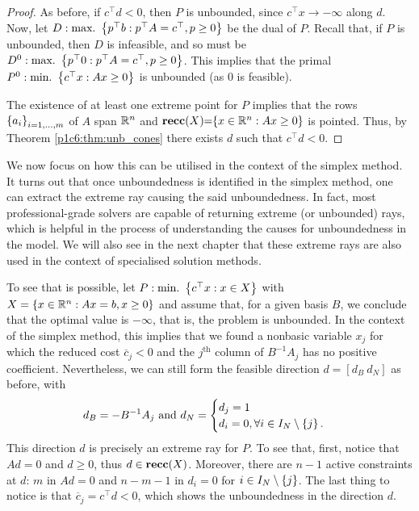 \begin{proof}
	As before, if $c^\top d < 0$, then $P$ is unbounded, since $c^\top x \rightarrow -\infty$ along $d$. Now, let 
	$D : \mathop{\text{max.~}} \left\{ p^\top b : p^\top A = c^\top, p \ge 0 \right \}$ be the dual of $P$. Recall that, if $P$ is unbounded, then $D$ is infeasible, and so must be $D^0 : \mathop{\text{max.~}} \left\{ p^\top 0 : p^\top A = c^\top, p \ge 0 \right \}$. This implies that the primal $P^0 : \mathop{\text{min.~}} \left\{ c^\top x : Ax \geq 0 \right \}$ is unbounded (as 0 is feasible).
			
	The existence of at least one extreme point for $P$ implies that the rows $\left\{ a_i \right \}_{i=1,\dots,m}$ of $A$ span $\mathbb{R}^n$ and  ${\bf recc}(X) \hspace{-3pt} =  \hspace{-3pt}\left\{ x \in \mathbb{R}^n : Ax \geq 0 \right \}$ is pointed. Thus, by Theorem \ref{p1c6:thm:unb_cones} there exists $d$ such that $c^\top d < 0$. \qedhere
\end{proof}

We now focus on how this can be utilised in the context of the simplex method. It turns out that once unboundedness is identified in the simplex method, one can extract the extreme ray causing the said unboundedness. In fact, most professional-grade solvers are capable of returning extreme (or unbounded) rays, which is helpful in the process of understanding the causes for unboundedness in the model. We will also see in the next chapter that these extreme rays are also used in the context of specialised solution methods.

To see that is possible, let $P : \mathop{\text{min.~}}\left\{ c^\top x : x \in X \right \}$ with $X = \left\{ x \in \mathbb{R}^n : Ax = b, x \geq 0 \right \}$ and assume that, for a given basis $B$, we conclude that the optimal value is $-\infty$, that is, the problem is unbounded. In the context of the simplex method, this implies that we found a nonbasic variable $x_j$ for which the reduced cost $\overline{c}_j < 0$ and the $j^\text{th}$ column of $B^{-1}A_j$ has no positive coefficient. Nevertheless, we can still form the feasible direction $d= [d_B ~ d_N]$ as before, with
%
\begin{equation*}
	d_B = -B^{-1}A_j \text{ and } 
	d_N = \begin{cases}
 		d_j = 1 \\
 		d_i = 0, \forall i \in I_N \setminus \left\{ j \right \}.
 	\end{cases}
\end{equation*}
%
This direction $d$ is precisely an extreme ray for $P$. To see that, first, notice that $Ad = 0$ and $d \geq 0$, thus	$d \in {\bf recc}(X)$. Moreover, there are $n-1$ active constraints at $d$: $m$ in $Ad = 0$ and $n-m-1$ in $d_i = 0$ for $i \in I_N \setminus \left\{ j \right \}$. The last thing to notice is that $\overline{c}_j = c^\top d < 0$, which shows the unboundedness in the direction $d$. 

